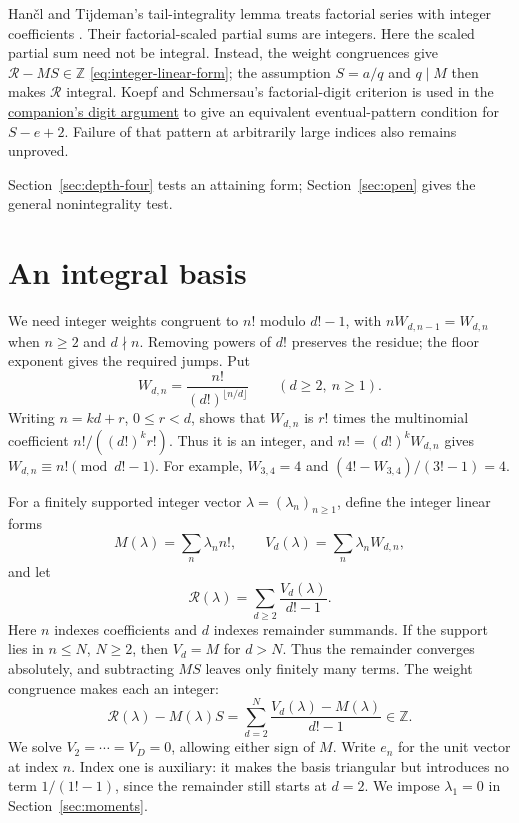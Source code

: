 \documentclass[11pt]{article}
\begin{document}
Han\v{c}l and Tijdeman's tail-integrality lemma treats factorial series
with integer coefficients \cite[Lemma~2.1 and the following remark,
p.~385]{hancl-tijdeman}. Their factorial-scaled partial sums are integers.
Here the scaled partial sum need not be integral. Instead, the weight
congruences give $\mathcal R-MS\in\mathbb Z$
\eqref{eq:integer-linear-form}; the assumption $S=a/q$ and $q\mid M$
then makes $\mathcal R$ integral. Koepf and Schmersau's factorial-digit
criterion \cite[Example~3.2, p.~121]{koepf-schmersau} is used in the
\href{erdos68-factorial-reasoning-surface.pdf\#r5-digits}{companion's digit argument}
to give an equivalent eventual-pattern condition for $S-e+2$. Failure
of that pattern at arbitrarily large indices also remains unproved.

Section~\ref{sec:depth-four} tests an attaining form;
Section~\ref{sec:open} gives the general nonintegrality test.

\section{An integral basis}\label{sec:channels}

We need integer weights congruent to $n!$ modulo $d!-1$, with
$nW_{d,n-1}=W_{d,n}$ when $n\ge2$ and $d\nmid n$.
Removing powers of $d!$ preserves the residue; the floor exponent
gives the required jumps. Put
\[
 W_{d,n}=\frac{n!}{(d!)^{\lfloor n/d\rfloor}}
 \qquad(d\ge2,\ n\ge1).
\]
Writing $n=kd+r$, $0\le r<d$, shows that $W_{d,n}$ is $r!$ times
the multinomial coefficient $n!/((d!)^k r!)$. Thus it is an integer,
and $n!=(d!)^kW_{d,n}$ gives $W_{d,n}\equiv n!\pmod{d!-1}$.
For example, $W_{3,4}=4$ and $(4!-W_{3,4})/(3!-1)=4$.

For a finitely supported integer vector $\lambda=(\lambda_n)_{n\ge1}$,
define the integer linear forms
\[
 M(\lambda)=\sum_n\lambda_n n!,\qquad
 V_d(\lambda)=\sum_n\lambda_nW_{d,n},
\]
and let
\[
 \mathcal R(\lambda)=\sum_{d\ge2}\frac{V_d(\lambda)}{d!-1}.
\]
Here $n$ indexes coefficients and $d$ indexes remainder summands.
If the support lies in $n\le N$, $N\ge2$, then $V_d=M$ for $d>N$.
Thus the remainder converges absolutely, and subtracting $MS$ leaves
only finitely many terms. The weight congruence makes each an integer:
\begin{equation}
 \mathcal R(\lambda)-M(\lambda)S
 =\sum_{d=2}^N\frac{V_d(\lambda)-M(\lambda)}{d!-1}\in\mathbb Z.
 \label{eq:integer-linear-form}
\end{equation}
We solve $V_2=\cdots=V_D=0$, allowing either sign of $M$. Write
$e_n$ for the unit vector at index $n$. Index one is auxiliary: it
makes the basis triangular but introduces no term $1/(1!-1)$,
since the remainder still starts at $d=2$. We impose $\lambda_1=0$
in Section~\ref{sec:moments}.
\end{document}
